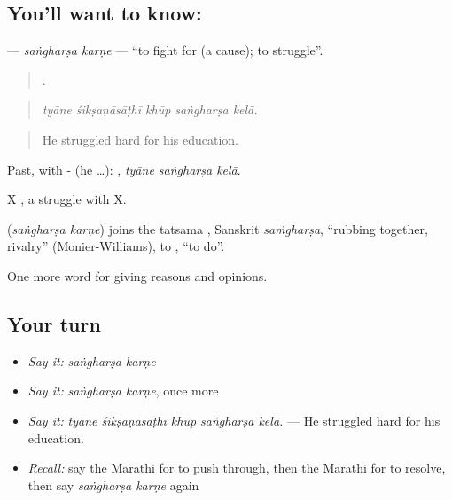 \subsection*{You'll want to know:  }
\textbf{ } — \emph{saṅgharṣa karṇe} — \textquotedblleft{}to fight for (a cause); to struggle\textquotedblright{}.

\begin{quote}
    .
\end{quote}

\begin{quote}
\emph{tyāne śikṣaṇāsāṭhī khūp saṅgharṣa kelā.}
\end{quote}

\begin{quote}
He struggled hard for his education.
\end{quote}

Past, with - (he …):   , \emph{tyāne saṅgharṣa kelā}.

X  , a struggle with X.

\begin{cousinweb}
\textbf{ } (\emph{saṅgharṣa karṇe}) joins the tatsama , Sanskrit \emph{saṁgharṣa}, \textquotedblleft{}rubbing together, rivalry\textquotedblright{} (Monier-Williams), to , \textquotedblleft{}to do\textquotedblright{}.
\end{cousinweb}

\begin{grammarlens}[title={What you've built}]
One more word for giving reasons and opinions.
\end{grammarlens}

\subsection*{Your turn}
\begin{itemize}
\raggedright
  \item \emph{Say it:} \emph{saṅgharṣa karṇe}
  \item \emph{Say it:} \emph{saṅgharṣa karṇe}, once more
  \item \emph{Say it:} \emph{tyāne śikṣaṇāsāṭhī khūp saṅgharṣa kelā.} — He struggled hard for his education.
  \item \emph{Recall:} say the Marathi for to push through, then the Marathi for to resolve, then say \emph{saṅgharṣa karṇe} again
\end{itemize}

